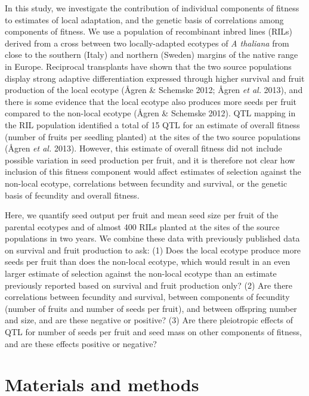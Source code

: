 \documentclass[]{article}
\begin{document}
In this study, we investigate the contribution of individual components of fitness to estimates of local adaptation, and the genetic basis of correlations among components of fitness. We use a population of recombinant inbred lines (RILs) derived from a cross between two locally-adapted ecotypes of \emph{A thaliana} from close to the southern (Italy) and northern (Sweden) margins of the native range in Europe. Reciprocal transplants have shown that the two source populations display strong adaptive differentiation expressed through higher survival and fruit production of the local ecotype (Ågren \& Schemske 2012; Ågren \emph{et al.} 2013), and there is some evidence that the local ecotype also produces more seeds per fruit compared to the non-local ecotype (Ågren \& Schemske 2012). QTL mapping in the RIL population identified a total of 15 QTL for an estimate of overall fitness (number of fruits per seedling planted) at the sites of the two source populations (Ågren \emph{et al.} 2013). However, this estimate of overall fitness did not include possible variation in seed production per fruit, and it is therefore not clear how inclusion of this fitness component would affect estimates of selection against the non-local ecotype, correlations between fecundity and survival, or the genetic basis of fecundity and overall fitness.

Here, we quantify seed output per fruit and mean seed size per fruit of the parental ecotypes and of almost 400 RILs planted at the sites of the source populations in two years. We combine these data with previously published data on survival and fruit production to ask: (1) Does the local ecotype produce more seeds per fruit than does the non-local ecotype, which would result in an even larger estimate of selection against the non-local ecotype than an estimate previously reported based on survival and fruit production only? (2) Are there correlations between fecundity and survival, between components of fecundity (number of fruits and number of seeds per fruit), and between offspring number and size, and are these negative or positive? (3) Are there pleiotropic effects of QTL for number of seeds per fruit and seed mass on other components of fitness, and are these effects positive or negative?

\hypertarget{materials-and-methods}{%
\section{Materials and methods}\label{materials-and-methods}}
\end{document}
